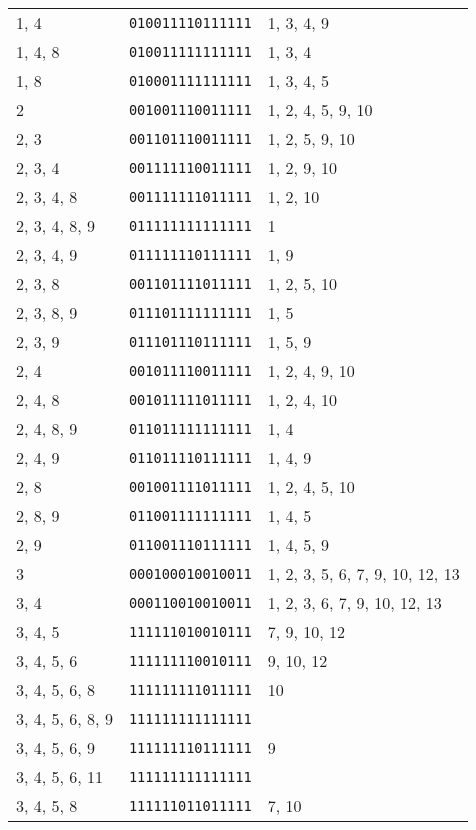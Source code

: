 \documentclass[a4paper,12pt]{article}
\begin{document}
\begin{longtable}{l|l|l}
        1, 4&\texttt{010011110111111}&1, 3, 4, 9\\
        1, 4, 8&\texttt{010011111111111}&1, 3, 4\\
        1, 8&\texttt{010001111111111}&1, 3, 4, 5\\
        2&\texttt{001001110011111}&1, 2, 4, 5, 9, 10\\
        2, 3&\texttt{001101110011111}&1, 2, 5, 9, 10\\
        2, 3, 4&\texttt{001111110011111}&1, 2, 9, 10\\
        2, 3, 4, 8&\texttt{001111111011111}&1, 2, 10\\
        2, 3, 4, 8, 9&\texttt{011111111111111}&1\\
        2, 3, 4, 9&\texttt{011111110111111}&1, 9\\
        2, 3, 8&\texttt{001101111011111}&1, 2, 5, 10\\
        2, 3, 8, 9&\texttt{011101111111111}&1, 5\\
        2, 3, 9&\texttt{011101110111111}&1, 5, 9\\
        2, 4&\texttt{001011110011111}&1, 2, 4, 9, 10\\
        2, 4, 8&\texttt{001011111011111}&1, 2, 4, 10\\
        2, 4, 8, 9&\texttt{011011111111111}&1, 4\\
        2, 4, 9&\texttt{011011110111111}&1, 4, 9\\
        2, 8&\texttt{001001111011111}&1, 2, 4, 5, 10\\
        2, 8, 9&\texttt{011001111111111}&1, 4, 5\\
        2, 9&\texttt{011001110111111}&1, 4, 5, 9\\
        3&\texttt{000100010010011}&1, 2, 3, 5, 6, 7, 9, 10, 12, 13\\
        3, 4&\texttt{000110010010011}&1, 2, 3, 6, 7, 9, 10, 12, 13\\
        3, 4, 5&\texttt{111111010010111}&7, 9, 10, 12\\
        3, 4, 5, 6&\texttt{111111110010111}&9, 10, 12\\
        3, 4, 5, 6, 8&\texttt{111111111011111}&10\\
        3, 4, 5, 6, 8, 9&\texttt{111111111111111}&\\
        3, 4, 5, 6, 9&\texttt{111111110111111}&9\\
        3, 4, 5, 6, 11&\texttt{111111111111111}&\\
        3, 4, 5, 8&\texttt{111111011011111}&7, 10\\

\end{longtable}
\end{document}
